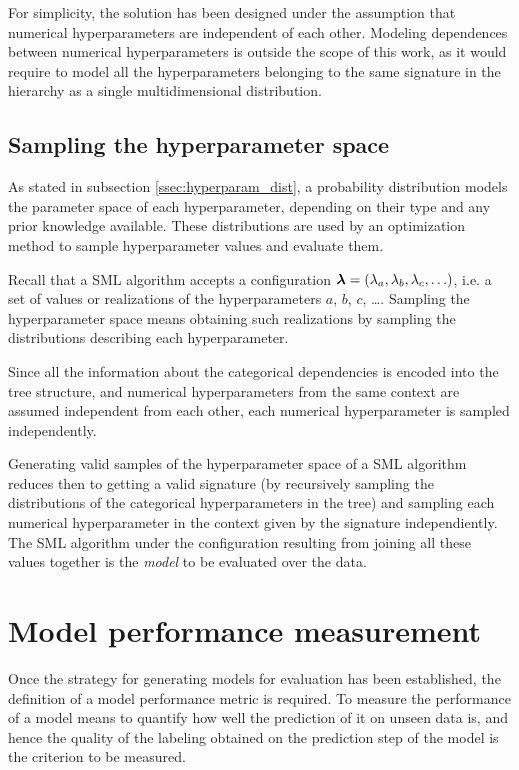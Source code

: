 	For simplicity, the solution has been designed under the assumption that numerical
	hyperparameters are independent of each other. Modeling dependences between numerical
	hyperparameters is outside the scope of this work, as it would require to model all the
	hyperparameters belonging to the same signature in the hierarchy as a single multidimensional
	distribution.

	\subsection{Sampling the hyperparameter space}
	\label{ssec:sampling}
	As stated in subsection \ref{ssec:hyperparam_dist}, a probability distribution models the
	parameter space of each hyperparameter, depending on their type and any prior knowledge
	available. These distributions are used by an optimization method to sample hyperparameter
	values and evaluate them.

	Recall that a SML algorithm accepts a configuration $\boldsymbol{\lambda} = (\lambda_a, \lambda_b,
	\lambda_c, \ldots)$, i.e. a set of values or realizations of the hyperparameters $a$, $b$,
	$c$, \ldots. Sampling the hyperparameter space means obtaining such realizations by
	sampling the distributions describing each hyperparameter.

	Since all the information about the categorical dependencies is encoded into the tree structure,
	and numerical hyperparameters from the same context are assumed independent from each other, each
	numerical hyperparameter is sampled independently.
	
	Generating valid samples of the hyperparameter space of a SML algorithm reduces then to getting
	a valid signature (by recursively sampling the distributions of the categorical hyperparameters
	in the tree) and sampling each numerical hyperparameter in the context given by the signature
	independiently. The SML algorithm under the configuration resulting from joining all these
	values together is the \emph{model} to be evaluated over the data.

\section{Model performance measurement}
	\label{sec:performance_measurement}
	
	Once the strategy for generating models for evaluation has been established, the definition of a
	model performance metric is required. To measure the performance of a model means to quantify
	how well the prediction of it on unseen data is, and hence the quality of the labeling obtained
	on the prediction step of the model is the criterion to be measured.

